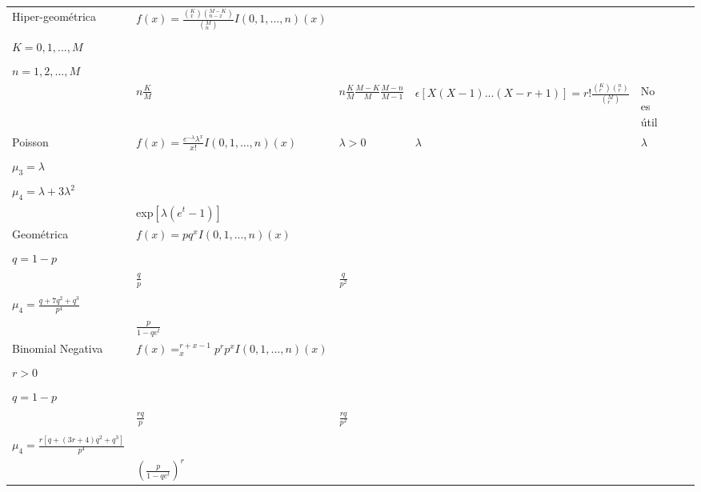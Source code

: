 \begin{table}[ht!]
\begin{tabular}{|p{1.5cm}|p{5.12cm}|p{2.13cm}|p{1cm}|p{2.13cm}|p{4.8cm}|p{2cm}|}
        Hiper-geométrica &
        $f(x) = \frac{(_{x}^{K})(_{n-x}^{M-K})}{(_{n}^{M})}I{(0,1,...,n)}(x)$ &
        \Longunderstack{
        $M = 1,2$  \\ \\
        $K = 0,1,...,M$ \\ \\
        $n = 1,2,...,M$
        \\} &
        $n\frac{K}{M}$ &
        $n\frac{K}{M}\frac{M-K}{M}\frac{M-n}{M-1}$ &
        $\epsilon[X(X-1)...(X-r+1)]=r!\frac{(_{r}^{K})(_{r}^{n})}{(_{r}^{M})}$ &
        No es útil
        \\ \hline
        
        Poisson &
        $f(x) = \frac{e^{-\lambda}\lambda^x}{x!}I{(0,1,...,n)}(x)$ &
        $\lambda > 0$ &
        $\lambda$ &
        $\lambda$ &
        \Longunderstack{
        $k_r =  \lambda$ para $r =1,2,...$  \\ \\
        $\mu_3 =  \lambda$ \\ \\
        $\mu_4 = \lambda+3\lambda^2$
        \\}&
        exp$[\lambda(e^t-1)]$
        \\ \hline
        
        Geométrica &
        $f(x) = pq^xI{(0,1,...,n)}(x)$ &
        \Longunderstack{
        $0 < p \leq 1 $  \\ \\
        $q = 1-p$ \\} &
        $\frac{q}{p}$ &
        $\frac{q}{p^2}$ &
        \Longunderstack{
        $\mu_3 = \frac{q+q^2}{p^2}$ \\ \\
        $\mu_4 = \frac{q+7q^2+q^3}{p^4}$
        \\}&
        $\frac{p}{1-qe^t}$
        \\ \hline
         
        Binomial Negativa &
        $f(x) = _{x}^{r+x-1}p^rp^xI{(0,1,...,n)}(x)$ &
        \Longunderstack{
        $0 < p \leq 1 $  \\ \\
        $r > 0 $  \\ \\
        $q = 1-p$ \\} &
        $\frac{rq}{p}$ &
        $\frac{rq}{p^2}$ &
        \Longunderstack{
        $\mu_3 = \frac{r(q+q^2)}{p^3}$ \\ \\
        $\mu_4 = \frac{r[q+(3r+4)q^2+q^3]}{p^4}$
        \\}&
        $(\frac{p}{1-qe^t})^r$
        
      \end{tabular}
\end{table}


